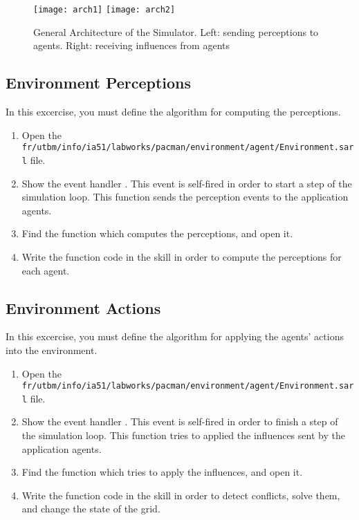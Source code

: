 \documentclass[article,english,nodocumentinfo,nosayenslogo,noicartslogo]{utbmciadreport}
\begin{document}
\begin{figure}
	\texttt{[image: arch1]}
	\hspace{1cm}
	\texttt{[image: arch2]}
	\caption{General Architecture of the Simulator. Left: sending perceptions to agents. Right: receiving influences from agents}
	\label{fig:simulator:arch}
\end{figure}

\subsection{Environment Perceptions}

In this excercise, you must define the algorithm for computing the perceptions.
\begin{enumerate}
\item Open the \texttt{fr/utbm/info/ia51/labworks/pacman/environment/agent/Environment.sarl} file.
\item Show the event handler . This event is self-fired in order to start a step of the simulation loop. This function sends the perception events to the application agents.
\item Find the function which computes the perceptions, and open it.
\item Write the function code in the skill in order to compute the perceptions for each agent.
\end{enumerate}

\subsection{Environment Actions}

In this excercise, you must define the algorithm for applying the agents' actions into the environment.
\begin{enumerate}
\item Open the \texttt{fr/utbm/info/ia51/labworks/pacman/environment/agent/Environment.sarl} file.
\item Show the event handler . This event is self-fired in order to finish a step of the simulation loop. This function tries to applied the influences sent by the application agents.
\item Find the function which tries to apply the influences, and open it.
\item Write the function code in the skill in order to detect conflicts, solve them, and change the state of the grid.
\end{enumerate}
\end{document}
